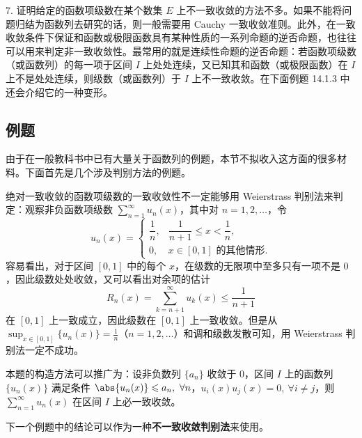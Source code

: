 7. 证明给定的函数项级数在某个数集 $E$ 上不一致收敛的方法不多。如果不能将问题归结为函数列去研究的话，则一般需要用 Cauchy 一致收敛准则。此外，在一致收敛条件下保证和函数或极限函数具有某种性质的一系列命题的逆否命题，也往往可以用来判定非一致收敛性。最常用的就是连续性命题的逆否命题：若函数项级数（或函数列）的每一项于区间 $I$ 上处处连续，又已知其和函数（或极限函数）在 $I$ 上不是处处连续，则级数（或函数列）于 $I$ 上不一致收敛。在下面例题 14.1.3 中还会介绍它的一种变形。

\subsection{例题}

由于在一般教科书中已有大量关于函数列的例题，本节不拟收入这方面的很多材料。下面首先是几个涉及判别方法的例题。

\begin{xexample}[14.1.2]
绝对一致收敛的函数项级数的一致收敛性不一定能够用 Weierstrass 判别法来判定：观察非负函数项级数 $\displaystyle\sum_{n=1}^{\infty}u_n(x)$，其中对 $n=1,2,\ldots$，令
\[
  u_n(x)=
  \begin{cases}
    \dfrac1n,& \dfrac1{n+1}\leqslant x<\dfrac1n,\\[4pt]
    0,& x\in[0,1]\text{ 的其他情形}.
  \end{cases}
\]
容易看出，对于区间 $[0,1]$ 中的每个 $x$，在级数的无限项中至多只有一项不是 $0$，因此级数处处收敛，又可以看出对余项的估计
\[
  R_n(x)=\sum_{k=n+1}^{\infty}u_k(x)\leqslant\frac1{n+1}
\]
在 $[0,1]$ 上一致成立，因此级数在 $[0,1]$ 上一致收敛。但是从 $\displaystyle\sup_{x\in[0,1]}\{u_n(x)\}=\frac1n$（$n=1,2,\ldots$）和调和级数发散可知，用 Weierstrass 判别法一定不成功。
\end{xexample}

\begin{xremark}
本题的构造方法可以推广为：设非负数列 $\{a_n\}$ 收敛于 $0$，区间 $I$ 上的函数列 $\{u_n(x)\}$ 满足条件 $\abs{u_n(x)}\leqslant a_n,\ \forall n$，$u_i(x)u_j(x)=0,\ \forall i\ne j$，则 $\displaystyle\sum_{n=1}^{\infty}u_n(x)$ 在区间 $I$ 上必一致收敛。
\end{xremark}

下一个例题中的结论可以作为一种\textbf{不一致收敛判别法}来使用。

